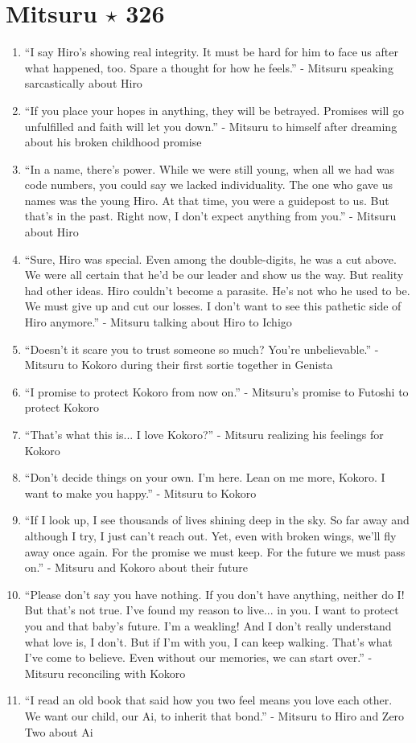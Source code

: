 \documentclass{book}
\numberwithin{equation}{section}
\begin{document}
\section{Mitsuru $\star$ 326}
\begin{enumerate}
    \item ``I say Hiro's showing real integrity. It must be hard for him to face us after what happened, too. Spare a thought for how he feels.'' - Mitsuru speaking sarcastically about Hiro
    \item ``If you place your hopes in anything, they will be betrayed. Promises will go unfulfilled and faith will let you down.'' - Mitsuru to himself after dreaming about his broken childhood promise
    \item ``In a name, there's power. While we were still young, when all we had was code numbers, you could say we lacked individuality. The one who gave us names was the young Hiro. At that time, you were a guidepost to us. But that's in the past. Right now, I don't expect anything from you.'' - Mitsuru about Hiro
    \item ``Sure, Hiro was special. Even among the double-digits, he was a cut above. We were all certain that he'd be our leader and show us the way. But reality had other ideas. Hiro couldn't become a parasite. He's not who he used to be. We must give up and cut our losses. I don't want to see this pathetic side of Hiro anymore.'' - Mitsuru talking about Hiro to Ichigo
    \item ``Doesn't it scare you to trust someone so much? You're unbelievable.'' - Mitsuru to Kokoro during their first sortie together in Genista
    \item ``I promise to protect Kokoro from now on.'' - Mitsuru's promise to Futoshi to protect Kokoro
    \item ``That's what this is... I love Kokoro?'' - Mitsuru realizing his feelings for Kokoro
    \item ``Don't decide things on your own. I'm here. Lean on me more, Kokoro. I want to make you happy.'' - Mitsuru to Kokoro
    \item ``If I look up, I see thousands of lives shining deep in the sky. So far away and although I try, I just can't reach out. Yet, even with broken wings, we'll fly away once again. For the promise we must keep. For the future we must pass on.'' - Mitsuru and Kokoro about their future
    \item ``Please don't say you have nothing. If you don't have anything, neither do I! But that's not true. I've found my reason to live... in you. I want to protect you and that baby's future. I'm a weakling! And I don't really understand what love is, I don't. But if I'm with you, I can keep walking. That's what I've come to believe. Even without our memories, we can start over.'' - Mitsuru reconciling with Kokoro
    \item ``I read an old book that said how you two feel means you love each other. We want our child, our Ai, to inherit that bond.'' - Mitsuru to Hiro and Zero Two about Ai
\end{enumerate}
\end{document}
